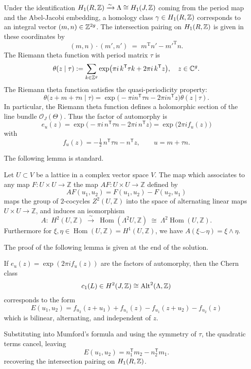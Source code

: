 \documentclass[12pt]{article}
\begin{document}
\begin{solution}
Under the identification
$H_1(R,\mathbb{Z})\xrightarrow{\sim}\Lambda\cong H_1(J,\mathbb{Z})$ coming from the period map and the Abel-Jacobi embedding, a homology class $\gamma\in H_1(R,\mathbb{Z})$ corresponds to an integral vector $(m,n)\in\mathbb{Z}^{2g}$. The intersection pairing on $H_1(R,\mathbb{Z})$ is given in these coordinates by
\[
(m,n)\cdot(m',n') \;=\; m^{\mathrm T}n' - m'^{\mathrm T}n.
\]
The Riemann theta function with period matrix $\tau$ is
\[
\theta(z\mid\tau)
:= \sum_{k\in\mathbb{Z}^g}
\exp\bigl(\pi i\,k^{\mathsf T}\tau k + 2\pi i\,k^{\mathsf T}z\bigr),
\quad z\in\mathbb{C}^g.
\]
The Riemann theta function satisfies the quasi-periodicity property:
\[
\theta\bigl(z + m + \tau n \mid \tau\bigr)
=
\exp\bigl(-\pi i n^{\mathsf T}\tau n - 2\pi in^{\mathsf T}z\bigr)
\theta(z\mid\tau).
\]
In particular, the Riemann theta function defines a holomorphic section of the line bundle $\mathcal{O}_J(\Theta)$.
Thus the factor of automorphy is
\[
e_u(z)
=\exp\bigl(-\pi i\,n^{\mathsf T}\tau n-2\pi i\,n^{\mathsf T}z\bigr)
=\exp\bigl(2\pi i f_u(z)\bigr)
\]
with
\[
f_u(z)=-\tfrac12\,n^{\mathsf T}\tau n - n^{\mathsf T}z,\qquad u=m+\tau n.
\]

The following lemma is standard.
\begin{lemma}
Let $U \subset V$ be a lattice in a complex vector space $V$. The map which associates to any map $F: U\times U \to \mathbb{Z}$ the
map $AF: U\times U\to \mathbb{Z}$ defined by
\[
  AF(u_{1},u_{2}) = F(u_{1},u_{2}) - F(u_{2},u_{1})
\]
maps the group of $2$-cocycles $Z^{2}(U,\mathbb{Z})$ into the space of
alternating linear maps $U\times U\to\mathbb{Z}$, and induces an
isomorphism
\[
  A:\;
  H^{2}(U,\mathbb{Z})
  \;\xrightarrow{\ \sim\ }\;
  \operatorname{Hom}(\Lambda^{2}U,\mathbb{Z})
  \;\cong\;
  \Lambda^{2}\operatorname{Hom}(U,\mathbb{Z}).
\]
Furthermore for $\xi,\eta\in\operatorname{Hom}(U,\mathbb{Z})=H^{1}(U,\mathbb{Z})$,
we have $A(\xi\smile\eta)=\xi\wedge\eta$.
\end{lemma} 
The proof of the following lemma is given at the end of the solution.
\begin{lemma}\label{lem:cc-rep}
  If $e_u(z)=\exp(2\pi i f_u(z))$ are the factors of automorphy, then the Chern class
\[c_1(L)\in H^2(J,\mathbb{Z})\cong\operatorname{Alt}^2(\Lambda,\mathbb{Z})\] corresponds to the form
\[
E(u_1,u_2)
= f_{u_2}(z+u_1)+f_{u_1}(z)-f_{u_1}(z+u_2)-f_{u_2}(z)
\]
which is bilinear, alternating, and independent of $z$.
\end{lemma}
Substituting into Mumford's formula and using the symmetry of $\tau$, the quadratic terms cancel, leaving
\[
E(u_1,u_2)= n_1^{\mathsf T}m_2 - n_2^{\mathsf T}m_1.
\]
recovering the intersection pairing on $H_1(R,\mathbb{Z})$.


\end{solution}
\end{document}
